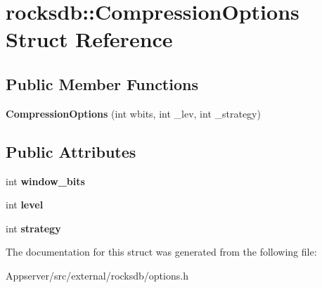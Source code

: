 \hypertarget{structrocksdb_1_1CompressionOptions}{}\section{rocksdb\+:\+:Compression\+Options Struct Reference}
\label{structrocksdb_1_1CompressionOptions}
\subsection*{Public Member Functions}
\begin{DoxyCompactItemize}
\item 
{\bfseries Compression\+Options} (int wbits, int \+\_\+lev, int \+\_\+strategy)\hypertarget{structrocksdb_1_1CompressionOptions_a88afd3a4616cc179c95e78d4869fe6f1}{}\label{structrocksdb_1_1CompressionOptions_a88afd3a4616cc179c95e78d4869fe6f1}

\end{DoxyCompactItemize}
\subsection*{Public Attributes}
\begin{DoxyCompactItemize}
\item 
int {\bfseries window\+\_\+bits}\hypertarget{structrocksdb_1_1CompressionOptions_a0e9ade99a0fd4d46b9a06a49cd6ebb01}{}\label{structrocksdb_1_1CompressionOptions_a0e9ade99a0fd4d46b9a06a49cd6ebb01}

\item 
int {\bfseries level}\hypertarget{structrocksdb_1_1CompressionOptions_a0c50f228e9dd8be754f2091e621fc552}{}\label{structrocksdb_1_1CompressionOptions_a0c50f228e9dd8be754f2091e621fc552}

\item 
int {\bfseries strategy}\hypertarget{structrocksdb_1_1CompressionOptions_ae29cf7de093c742ff2342b20bbec1fce}{}\label{structrocksdb_1_1CompressionOptions_ae29cf7de093c742ff2342b20bbec1fce}

\end{DoxyCompactItemize}


The documentation for this struct was generated from the following file\+:\begin{DoxyCompactItemize}
\item 
Appserver/src/external/rocksdb/options.\+h\end{DoxyCompactItemize}
